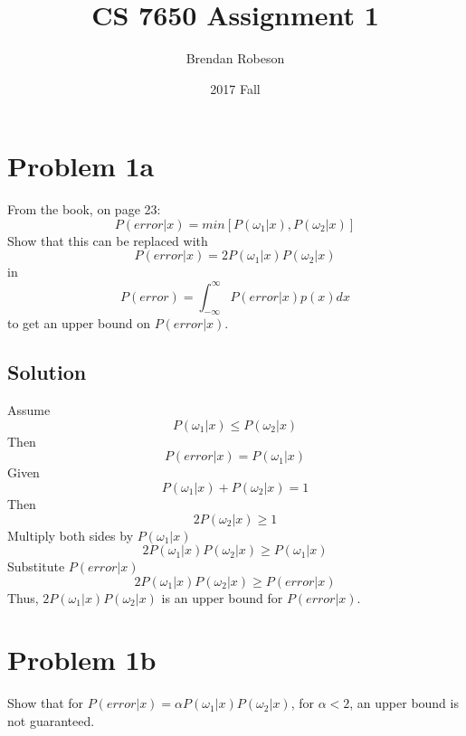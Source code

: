 \documentclass{IEEEtran}
\title{CS 7650 Assignment 1}
\author{Brendan Robeson}
\date{2017 Fall}
\begin{document}
\maketitle

\section{Problem 1a}
From the book, on page 23:
\begin{equation}
    P(error|x) = min[P(\omega_1|x),P(\omega_2|x)]
\end{equation}
Show that this can be replaced with
\begin{equation}
    P(error|x) = 2P(\omega_1|x)P(\omega_2|x)
\end{equation}
in
\begin{equation}
    P(error) = \int_{-\infty}^\infty P(error|x)p(x)dx
\end{equation}
to get an upper bound on \(P(error|x)\).
\subsection{Solution}
Assume
\begin{equation}
    P(\omega_1|x) \le P(\omega_2|x)
\end{equation}
Then
\begin{equation}
    P(error|x) = P(\omega_1|x)
\end{equation}
Given
\begin{equation}
    P(\omega_1|x) + P(\omega_2|x) = 1
\end{equation}
Then
\begin{equation}
    2P(\omega_2|x) \ge 1
\end{equation}
Multiply both sides by \(P(\omega_1|x)\)
\begin{equation}
    2P(\omega_1|x)P(\omega_2|x) \ge P(\omega_1|x)
\end{equation}
Substitute \(P(error|x)\)
\begin{equation}
    2P(\omega_1|x)P(\omega_2|x) \ge P(error|x)
\end{equation}
Thus, \(2P(\omega_1|x)P(\omega_2|x)\) is an upper bound for \(P(error|x)\).

\newpage

\section{Problem 1b}
Show that for \(P(error|x) = \alpha P(\omega_1|x)P(\omega_2|x)\), for \(\alpha < 2\), an upper bound
is not guaranteed.
\end{document}
